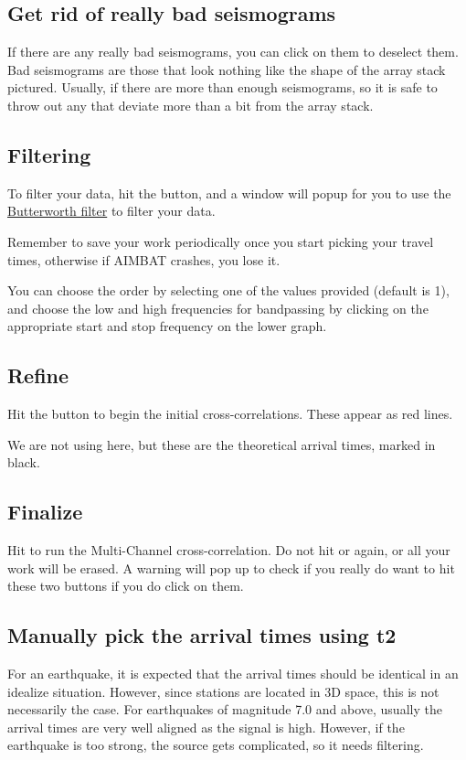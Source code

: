 \documentclass[letterpaper,10pt,english]{sphinxmanual}
\begin{document}
\subsection{Get rid of really bad seismograms}
\label{docfiles/PickingTravelTimes:get-rid-of-really-bad-seismograms}
If there are any really bad seismograms, you can click on them to deselect them. Bad seismograms are those that look nothing like the shape of the array stack pictured. Usually, if there are more than enough seismograms, so it is safe to throw out any that deviate more than a bit from the array stack.


\subsection{Filtering}
\label{docfiles/PickingTravelTimes:filtering}
To filter your data, hit the  button, and a window will popup for you to use the \href{http://en.wikipedia.org/wiki/Butterworth\_filter}{Butterworth filter} to filter your data.

Remember to save your work periodically once you start picking your travel times, otherwise if AIMBAT crashes, you lose it.

You can choose the order by selecting one of the values provided (default is 1), and choose the low and high frequencies for bandpassing by clicking on the appropriate start and stop frequency on the lower graph.


\subsection{Refine}
\label{docfiles/PickingTravelTimes:refine}
Hit the  button to begin the initial cross-correlations. These appear as red lines.

We are not using  here, but these are the theoretical arrival times, marked in black.


\subsection{Finalize}
\label{docfiles/PickingTravelTimes:finalize}
Hit  to run the Multi-Channel cross-correlation. Do not hit  or  again, or all your work will be erased. A warning will pop up to check if you really do want to hit these two buttons if you do click on them.


\subsection{Manually pick the arrival times using t2}
\label{docfiles/PickingTravelTimes:manually-pick-the-arrival-times-using-t2}
For an earthquake, it is expected that the arrival times should be identical in an idealize situation. However, since stations are located in 3D space, this is not necessarily the case. For earthquakes of magnitude 7.0 and above, usually the arrival times are very well aligned as the signal is high. However, if the earthquake is too strong, the source gets complicated, so it needs filtering.
\end{document}
